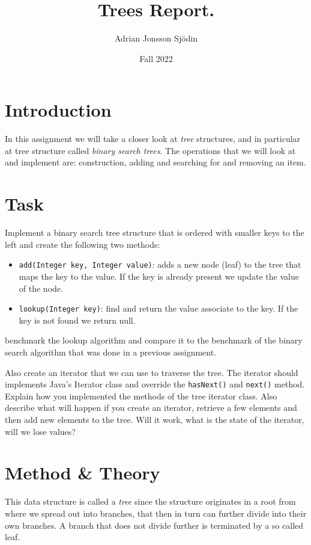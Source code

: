 \documentclass[a4paper,11pt]{article}
\begin{document}
\title{
    \textbf{Trees Report.}
}
\author{Adrian Jonsson Sjödin}
\date{Fall 2022}

\maketitle

\section{Introduction}
In this assignment we will take a closer look at \textit{tree} structures, and in
particular at tree structure called \textit{binary search trees}. The operations that we will look at and
implement are: construction, adding and searching for and removing an item.

\section{Task}
Implement a binary search tree structure that is ordered with smaller keys to the left and create the
following two methods:
\begin{itemize}
    \item {\tt add(Integer key, Integer value)}: adds a new node (leaf) to the
          tree that maps the key to the value. If the key is already present we
          update the value of the node.
    \item {\tt lookup(Integer key)}: find and return the value associate to the
          key. If the key is not found we return null.
\end{itemize}
benchmark the lookup algorithm and compare it to the benchmark of the binary search algorithm that
was done in a previous assignment.

Also create an iterator that we can use to traverse the tree. The iterator should implements Java's
Iterator class and override the {\tt hasNext()} and {\tt next()} method. Explain how you implemented
the methods of the tree iterator class. Also describe what will happen if you create an iterator,
retrieve a few elements and then add new elements to the tree. Will it work, what is the state of the
iterator, will we lose values?

\section{Method \& Theory}
This data structure is called a \textit{tree} since the structure originates in a root from where we
spread out into branches, that then in turn can further divide into their own branches. A branch that
does not divide further is terminated by a so called leaf.
\end{document}
